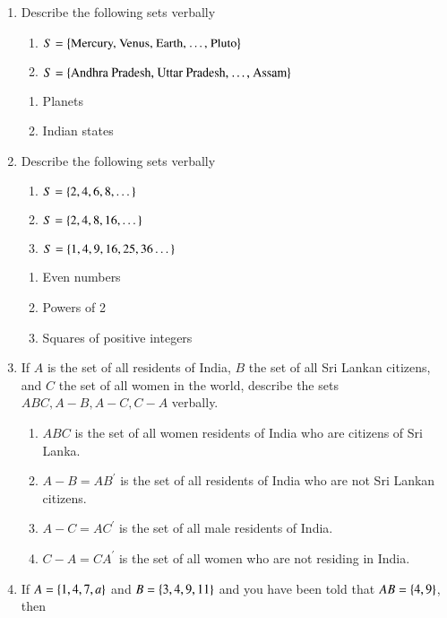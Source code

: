 \renewcommand{\theequation}{\theenumi}

\begin{enumerate}[label=\arabic*.,ref=\thesubsection.\theenumi]

	\item Describe the following sets verbally
\begin{enumerate}
	\item $S = \left\{\text{Mercury, Venus, Earth, \dots, Pluto}\right\}$
	\item $S = \left\{\text{Andhra Pradesh, Uttar Pradesh,  \dots, Assam}\right\}$
\end{enumerate}
\solution 
\begin{enumerate}
	\item Planets
	\item Indian states
\end{enumerate}
\item Describe the following sets verbally
\begin{enumerate}
	\item $S = \left\{2, 4, 6, 8, \dots\right\}$
	\item $S = \left\{2, 4, 8,  16, \dots\right\}$
	\item $S = \left\{1, 4, 9, 16, 25, 36 \dots\right\}$
\end{enumerate}
\solution 
\begin{enumerate}
	\item Even numbers
	\item Powers of 2
	\item Squares of positive integers
\end{enumerate}
\item If $A$ is the set of all residents of India, $B$ the set of all Sri Lankan citizens, and $C$ the set of all
	women in the world, describe the sets $ABC, A-B, A-C, C-A$ verbally.
	\\
		\solution 
\begin{enumerate}
	\item $ABC$ is the set of all women residents of India who are citizens of Sri Lanka.
	\item $A-B = AB^{\prime}$ is the set of all residents of India who are not Sri Lankan citizens.
	\item $A-C = AC^{\prime}$ is the set of all male residents of India.
	\item $C-A = CA^{\prime}$ is the set of all women who are not residing in India.
\end{enumerate}
\item If $A = \left\{1, 4, 7, a\right\} $ and $B = \left\{3,4,9,11\right\}$ and you have been told that $AB = \left\{4, 9\right\}$, then

\end{enumerate}
